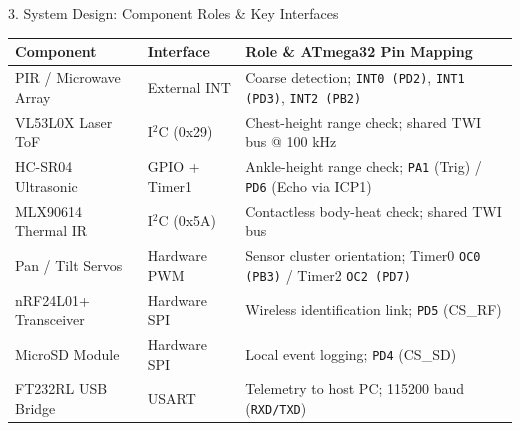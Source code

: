 \documentclass[aspectratio=169, 10pt]{beamer}
\begin{document}
\begin{frame}{3. System Design: Component Roles \& Key Interfaces}
    \small
    \begin{table}
        \centering
        \color{TextInk}
        \begin{tabular}{llp{5.3cm}}
            \toprule
            \textbf{\color{AmberAccent} Component} & \textbf{\color{AmberAccent} Interface} & \textbf{\color{AmberAccent} Role \& ATmega32 Pin Mapping} \\
            \midrule
            PIR / Microwave Array & External INT & Coarse detection; \texttt{INT0 (PD2)}, \texttt{INT1 (PD3)}, \texttt{INT2 (PB2)} \\
            VL53L0X Laser ToF & I$^2$C (0x29) & Chest-height range check; shared TWI bus @ 100 kHz \\
            HC-SR04 Ultrasonic & GPIO + Timer1 & Ankle-height range check; \texttt{PA1} (Trig) / \texttt{PD6} (Echo via ICP1) \\
            MLX90614 Thermal IR & I$^2$C (0x5A) & Contactless body-heat check; shared TWI bus \\
            Pan / Tilt Servos & Hardware PWM & Sensor cluster orientation; Timer0 \texttt{OC0 (PB3)} / Timer2 \texttt{OC2 (PD7)} \\
            nRF24L01+ Transceiver & Hardware SPI & Wireless identification link; \texttt{PD5} (CS\_RF) \\
            MicroSD Module & Hardware SPI & Local event logging; \texttt{PD4} (CS\_SD) \\
            FT232RL USB Bridge & USART & Telemetry to host PC; 115200 baud (\texttt{RXD/TXD}) \\
            \bottomrule
        \end{tabular}
    \end{table}
\end{frame}
\end{document}
